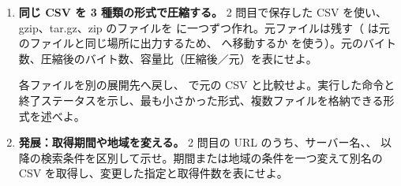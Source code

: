 \begin{enumerate}
\item \textbf{同じ CSV を 3 種類の形式で圧縮する。}
2 問目で保存した CSV を使い、gzip、tar.gz、zip のファイルを  に一つずつ作れ。元ファイルは残す（ は元のファイルと同じ場所に出力するため、 へ移動するか  を使う）。元のバイト数、圧縮後のバイト数、容量比（圧縮後／元）を表にせよ。

各ファイルを別の展開先へ戻し、 で元の CSV と比較せよ。実行した命令と終了ステータスを示し、最も小さかった形式、複数ファイルを格納できる形式を述べよ。

\item \textbf{発展：取得期間や地域を変える。}
2 問目の URL のうち、サーバー名、、 以降の検索条件を区別して示せ。期間または地域の条件を一つ変えて別名の CSV を取得し、変更した指定と取得件数を表にせよ。

\end{enumerate}
